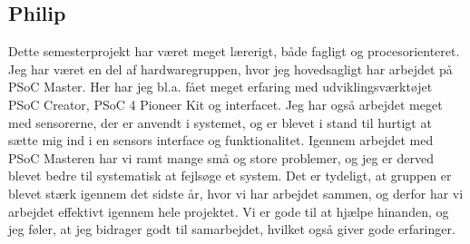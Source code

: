 \subsection{Philip}

Dette semesterprojekt har været meget lærerigt, både fagligt og procesorienteret. Jeg har været en del af hardwaregruppen, hvor jeg hovedsagligt har arbejdet på PSoC Master. Her har jeg bl.a. fået meget erfaring med udviklingsværktøjet PSoC Creator, PSoC 4 Pioneer Kit og \IIC interfacet. Jeg har også arbejdet meget med sensorerne, der er anvendt i systemet, og er blevet i stand til hurtigt at sætte mig ind i en sensors interface og funktionalitet. Igennem arbejdet med PSoC Masteren har vi ramt mange små og store problemer, og jeg er derved blevet bedre til systematisk at fejlsøge et system. Det er tydeligt, at gruppen er blevet stærk igennem det sidste år, hvor vi har arbejdet sammen, og derfor har vi arbejdet effektivt igennem hele projektet. Vi er gode til at hjælpe hinanden, og jeg føler, at jeg bidrager godt til samarbejdet, hvilket også giver gode erfaringer.